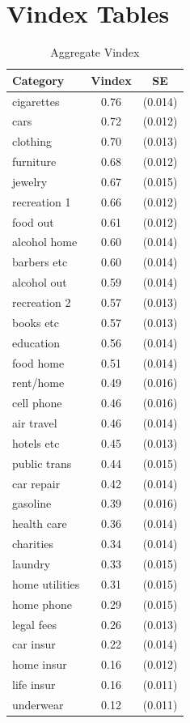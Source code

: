 \documentclass[12pt]{article}
\begin{document}
\newpage




\newpage

\appendix

\section{Vindex Tables}
\label{sec:vin_tables}

\begin{table}[!ht]
    \centering
\begin{tabular}{lcc}
	\hline\hline
	Category & Vindex & SE \\
	\hline 
cigarettes       & 0.76 & (0.014) \\
cars             & 0.72 & (0.012) \\
clothing         & 0.70 & (0.013) \\
furniture        & 0.68 & (0.012) \\
jewelry          & 0.67 & (0.015) \\
recreation 1     & 0.66 & (0.012) \\
food out         & 0.61 & (0.012) \\
alcohol home     & 0.60 & (0.014) \\
barbers etc      & 0.60 & (0.014) \\
alcohol out      & 0.59 & (0.014) \\
recreation 2     & 0.57 & (0.013) \\
books etc        & 0.57 & (0.013) \\
education        & 0.56 & (0.014) \\
food home        & 0.51 & (0.014) \\
rent/home        & 0.49 & (0.016) \\
cell phone       & 0.46 & (0.016) \\
air travel       & 0.46 & (0.014) \\
hotels etc       & 0.45 & (0.013) \\
public trans     & 0.44 & (0.015) \\
car repair       & 0.42 & (0.014) \\
gasoline         & 0.39 & (0.016) \\
health care      & 0.36 & (0.014) \\
charities        & 0.34 & (0.014) \\
laundry          & 0.33 & (0.015) \\
home utilities   & 0.31 & (0.015) \\
home phone       & 0.29 & (0.015) \\
legal fees       & 0.26 & (0.013) \\
car insur        & 0.22 & (0.014) \\
home insur       & 0.16 & (0.012) \\
life insur       & 0.16 & (0.011) \\
underwear        & 0.12 & (0.011) \\
\hline
\end{tabular}
\caption{Aggregate Vindex}
\label{tab:vintab}
\vspace{-2in}
\end{table}
\end{document}
